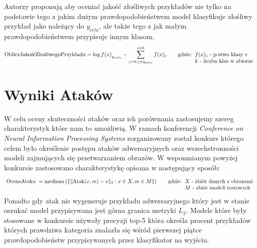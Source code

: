 \documentclass[
    left=2.5cm,         %
    right=2.5cm,        %
    top=2.5cm,          %
    bottom=3cm,         %
    bindingoffset=6mm,  %
    nohyphenation=false %
]{eiti/eiti-thesis}
\begin{document}
Autorzy proponują aby oceniać jakość złośliwych przykładów nie tylko na podstawie tego z jakim dużym prawdopodobieństwem
model klasyfikuje złośliwy przykład jako należący do \(y_{celu}\), ale także tego z jak małym prawdopodobieństwem przypisuje innym klasom.
\begin{equation}
    \text{ObliczJakośćZłośliwegoPrzykładu} = \log{f(x)}_{y_{celu}} - \sum^{j=k}_{j=0,j\neq y_{celu}} f(x)_c
    \qquad\text{gdzie:}
    \begin{tabular}[t]{ll}
    \(f(x)_c\) - p-stwo klasy c\\
    \(k\) - liczba klas w zbiorze\\
    \end{tabular}
\end{equation}

\newpage
\section{Wyniki Ataków}
    W celu oceny skuteczności ataków oraz ich porównania zastosujemy szereg charakterystyk które nam to umożliwią.
    W ramach konferencji
    \textit{Conference on Neural Information Processing Systems} zorganizowany został konkurs którego celem było
    określenie postępu ataków adwersaryjnych oraz wszechstronności modeli zajmujących się przetwarzaniem obrazów\cite{DBLP:journals/corr/abs-1808-01976}.
    W wspomnianym powyżej konkursie zastosowano charakterystykę opisana w następujący sposób:
    \begin{equation}\label{nips_median}
        \text { OcenaAtaku }=\operatorname{mediana}\left(\left\{\|\text{Atak}{(x, m)}-x\|_2 : x \in X, m \in M\right\}\right)
        \qquad\text{gdzie:}
        \begin{tabular}[t]{ll}
        \(X\) - zbiór danych z obrazami \\
        \(M\) - zbiór modeli testowych\\
        \end{tabular}
    \end{equation}
    Ponadto gdy atak nie wygeneruje przykładu adwersaryjnego który jest w stanie oszukać model przypisywana jest górna granica
    metryki \(L_2\).
    Modele które były stosowane w konkursie używały precyzji top-5 która określa procent przykładów których prawdziwa
    kategoria znalazła się wśród pierwszej piątce prawdopodobieństw przypisywanych przez klasyfikator na wyjściu.\\
\end{document}
